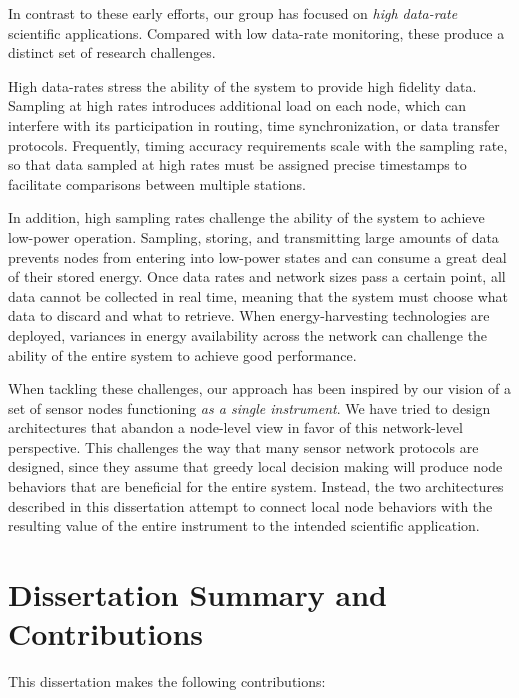 In contrast to these early efforts, our group has focused on \textit{high
data-rate} scientific applications. Compared with low data-rate monitoring,
these produce a distinct set of research challenges.

High data-rates stress the ability of the system to provide high
fidelity data. Sampling at high rates introduces additional load on each
node, which can interfere with its participation in routing, time
synchronization, or data transfer protocols. Frequently, timing accuracy
requirements scale with the sampling rate, so that data sampled at high rates
must be assigned precise timestamps to facilitate comparisons between
multiple stations.

In addition, high sampling rates challenge the ability of the system to
achieve low-power operation. Sampling, storing, and transmitting large
amounts of data prevents nodes from entering into low-power states and can
consume a great deal of their stored energy. Once data rates and network
sizes pass a certain point, all data cannot be collected in real time,
meaning that the system must choose what data to discard and what to
retrieve. When energy-harvesting technologies are deployed, variances in
energy availability across the network can challenge the ability of the
entire system to achieve good performance.

When tackling these challenges, our approach has been inspired by our vision
of a set of sensor nodes functioning \textit{as a single instrument}. We have
tried to design architectures that abandon a node-level view in favor of this
network-level perspective. This challenges the way that many sensor network
protocols are designed, since they assume that greedy local decision making
will produce node behaviors that are beneficial for the entire system.
Instead, the two architectures described in this dissertation attempt to
connect local node behaviors with the resulting value of the entire
instrument to the intended scientific application.

\section{Dissertation Summary and Contributions}

This dissertation makes the following contributions:

